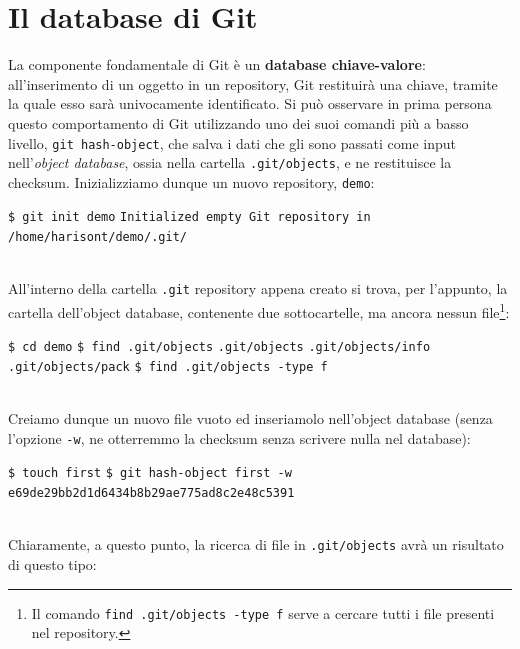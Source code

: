 \documentclass[12pt]{article}
\def\code#1{\texttt{#1}}
\begin{document}
\section{Il database di Git} %
La componente fondamentale di Git è un \textbf{database chiave-valore}: all'inserimento di un oggetto in un repository, Git restituirà una chiave, tramite la quale esso sarà univocamente identificato. 
Si può osservare in prima persona questo comportamento di Git utilizzando uno dei suoi comandi più a basso livello, \code{git hash-object}, che salva i dati che gli sono passati come input nell'\textit{object database}, ossia nella cartella \code{.git/objects}, e ne restituisce la checksum.
Inizializziamo dunque un nuovo repository, \code{demo}:
\begin{algorithm*}
	\begin{algorithmic}
		\State \code{\$ git init demo}
		\State \code{Initialized empty Git repository in /home/harisont/demo/.git/}	
	\end{algorithmic}
\end{algorithm*}
\\All'interno della cartella \code{.git} repository appena creato si trova, per l'appunto, la cartella dell'object database, contenente due sottocartelle, ma ancora nessun file\footnote{Il comando \code{find .git/objects -type f} serve a cercare tutti i file presenti nel repository.}:
\begin{algorithm*}
	\begin{algorithmic}
		\State \code{\$ cd demo}
		\State \code{\$ find .git/objects}	
		\State \code{.git/objects}	
		\State \code{.git/objects/info}
		\State \code{.git/objects/pack}
		\State \code{\$ find .git/objects -type f}
		\State \code{ \ }
	\end{algorithmic}
\end{algorithm*}
\bigskip \\Creiamo dunque un nuovo file vuoto ed inseriamolo nell'object database (senza l'opzione \code{-w}, ne otterremmo la checksum senza scrivere nulla nel database):
\begin{algorithm*}
	\begin{algorithmic}
		\State \code{\$ touch first}
		\State \code{\$ git hash-object first -w}	
		\State \code{e69de29bb2d1d6434b8b29ae775ad8c2e48c5391}	
	\end{algorithmic}
\end{algorithm*}
\bigskip \\
Chiaramente, a questo punto, la ricerca di file in \code{.git/objects} avrà un risultato di questo tipo:
\end{document}
